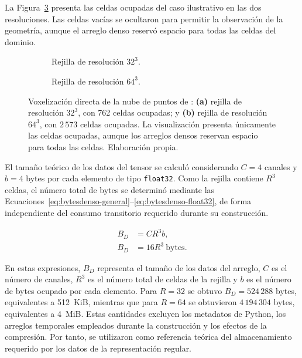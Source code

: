 La Figura~\ref{fig:rejillas} presenta las celdas ocupadas del caso ilustrativo en las dos resoluciones. Las celdas vacías se ocultaron para permitir la observación de la geometría, aunque el arreglo denso reservó espacio para todas las celdas del dominio.
\begin{figure}[htbp]
\centering
\begin{subfigure}[t]{.48\textwidth}
\centering
{}
\caption{Rejilla de resolución $32^3$.}\label{fig:rejilla32}
\end{subfigure}
\hfill
\begin{subfigure}[t]{.48\textwidth}
\centering
{}
\caption{Rejilla de resolución $64^3$.}\label{fig:rejilla64}
\end{subfigure}
\caption{Voxelización directa de la nube de puntos de \protect{}: \textbf{(a)} rejilla de resolución $32^3$, con 762 celdas ocupadas; y \textbf{(b)} rejilla de resolución $64^3$, con $2\,573$ celdas ocupadas. La visualización presenta únicamente las celdas ocupadas, aunque los arreglos densos reservan espacio para todas las celdas. Elaboración propia.}
\label{fig:rejillas}
\end{figure}

El tamaño teórico de los datos del tensor se calculó considerando
$C=4$ canales y $b=4$ bytes por cada elemento de tipo
\texttt{float32}. Como la rejilla contiene $R^3$ celdas, el número
total de bytes se determinó mediante las Ecuaciones~\eqref{eq:bytesdenso-general}--\eqref{eq:bytesdenso-float32}, de forma independiente del consumo
transitorio requerido durante su construcción.

\begin{subequations}\label{eq:bytesdenso}
\begin{align}
B_D&=C R^3 b, \label{eq:bytesdenso-general} \\
B_D&=16R^3\ \text{bytes}. \label{eq:bytesdenso-float32}
\end{align}
\end{subequations}

En estas expresiones, $B_D$ representa el tamaño de los datos del arreglo,
$C$ es el número de canales, $R^3$ es el número total de celdas de la
rejilla y $b$ es el número de bytes ocupado por cada elemento. Para
$R=32$ se obtuvo
$B_D=524\,288$ bytes, equivalentes a 512~KiB, mientras que para
$R=64$ se obtuvieron $4\,194\,304$ bytes, equivalentes a 4~MiB.
Estas cantidades excluyen los metadatos de Python, los arreglos
temporales empleados durante la construcción y los efectos de la
compresión. Por tanto, se utilizaron como referencia teórica del
almacenamiento requerido por los datos de la representación regular.

